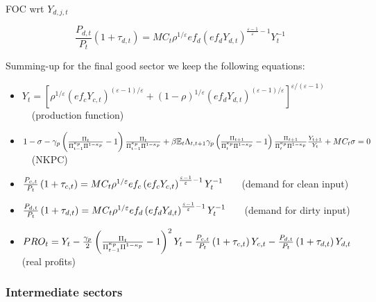 \documentclass{article}
\begin{document}
FOC wrt $Y_{d,j,t}$

\bigskip 
\begin{equation*}
\frac{P_{d,t}}{P_{t}}\left( 1+\tau _{d,t}\right) =MC_{t}\rho ^{1/\varepsilon
}ef_{d}\left( ef_{d}Y_{d,t}\right) ^{\frac{\varepsilon -1}{\varepsilon }%
-1}Y_{t}^{-1}
\end{equation*}

Summing-up for the final good sector we keep the following equations:

\begin{itemize}
\item $Y_{t}=\left[ \rho ^{1/\varepsilon }\left( ef_{c}Y_{c,t}\right)
^{\left( \varepsilon -1\right) /\varepsilon }+(1-\rho )^{1/\varepsilon
}\left( ef_{d}Y_{d,t}\right) ^{\left( \varepsilon -1\right) /\varepsilon }%
\right] ^{\varepsilon /(\varepsilon -1)}$ \ \ (production function)

\item $1-\sigma -\gamma _{p}\left( \frac{\Pi _{t}}{\Pi _{t-1}^{\kappa
_{p}}\Pi ^{1-\kappa _{p}}}-1\right) \frac{\Pi _{t}}{\Pi _{t-1}^{\kappa
_{p}}\Pi ^{1-\kappa _{p}}}+\beta \mathbb{E}_{t}\Lambda _{t,t+1}\gamma
_{p}\left( \frac{\Pi _{t+1}}{\Pi _{t}^{\kappa _{p}}\Pi ^{1-\kappa _{p}}}%
-1\right) \frac{\Pi _{t+1}}{\Pi _{t}^{\kappa _{p}}\Pi ^{1-\kappa _{p}}}\frac{%
Y_{t+1}}{Y_{t}}+MC_{t}\sigma =0$ \ \ (NKPC)

\item $\frac{P_{c,t}}{P_{t}}\left( 1+\tau _{c,t}\right) =MC_{t}\rho
^{1/\varepsilon }ef_{c}\left( ef_{c}Y_{c,t}\right) ^{\frac{\varepsilon -1}{%
\varepsilon }-1}Y_{t}^{-1}$ \ \ \ (demand for clean input)

\item $\frac{P_{d,t}}{P_{t}}\left( 1+\tau _{d,t}\right) =MC_{t}\rho
^{1/\varepsilon }ef_{d}\left( ef_{d}Y_{d,t}\right) ^{\frac{\varepsilon -1}{%
\varepsilon }-1}Y_{t}^{-1}$ \ \ \ (demand for dirty input)

\item $PRO_{t}=Y_{t}-\frac{\gamma _{p}}{2}\left( \frac{\Pi _{t}}{\Pi
_{t-1}^{\kappa _{p}}\Pi ^{1-\kappa _{p}}}-1\right) ^{2}Y_{t}-\frac{P_{c,t}}{%
P_{t}}\left( 1+\tau _{c,t}\right) Y_{c,t}-\frac{P_{d,t}}{P_{t}}\left( 1+\tau
_{d,t}\right) Y_{d,t}$ (real profits)
\end{itemize}

\subsubsection{Intermediate sectors}
\end{document}
